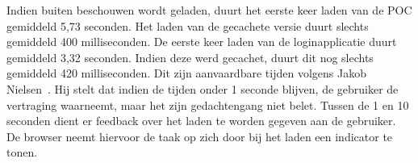 
Indien \st{} buiten beschouwen wordt geladen, duurt het eerste keer laden van de POC gemiddeld 5,73 seconden. Het laden van de gecachete versie duurt slechts gemiddeld 400 milliseconden.
De eerste keer laden van de loginapplicatie duurt gemiddeld 3,32 seconden.
Indien deze werd gecachet, duurt dit nog slechts gemiddeld 420 milliseconden.
Dit zijn aanvaardbare tijden volgens Jakob Nielsen~\cite{Nielsen1993}.
Hij stelt dat indien de tijden onder 1 seconde blijven, de gebruiker de vertraging waarneemt, maar het zijn gedachtengang niet belet.
Tussen de 1 en 10 seconden dient er feedback over het laden te worden gegeven aan de gebruiker.
De browser neemt hiervoor de taak op zich door bij het laden een indicator te tonen.


\begin{table}[H]
\centering
{}
\caption{Metrieken gebruikt bij de verklaring van performantiecriterium voor \st{}~(\sta), \kendo{}~(\kendoa), \jqm{}~(\jqma) en \lungo{}~(\lungoa).}
\label{tabel:performantie-verklaring}
\end{table}


